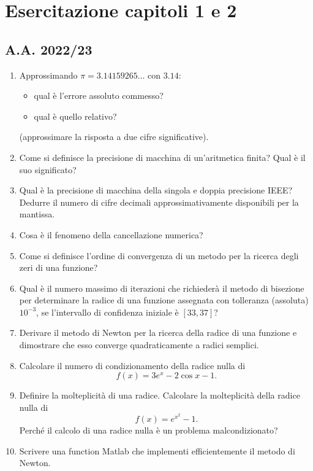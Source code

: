 \section{Esercitazione capitoli 1 e 2}
\subsection{A.A. 2022/23}
\begin{enumerate}
	\item Approssimando $\pi = 3.14159265\hdots$ con $3.14$:
	\begin{itemize}
		\item qual è l’errore assoluto commesso?
		\item  qual è quello relativo?
	\end{itemize}
	(approssimare la risposta a due cifre significative).
	\item Come si definisce la precisione di macchina di un’aritmetica finita? Qual è il suo significato?
	\item Qual è la precisione di macchina della singola e doppia precisione IEEE? Dedurre il numero di cifre decimali approssimativamente disponibili per la mantissa.
	\item Cosa è il fenomeno della cancellazione numerica?
	\item Come si definisce l’ordine di convergenza di un metodo per la ricerca degli zeri di una funzione?
	\item Qual è il numero massimo di iterazioni che richiederà il metodo di bisezione per determinare la radice di una funzione assegnata con tolleranza (assoluta) $10^{-3}$, se l’intervallo di confidenza iniziale è $[33, 37]$?
	\item Derivare il metodo di Newton per la ricerca della radice di una funzione e dimostrare che esso converge quadraticamente a radici semplici.
	\item Calcolare il numero di condizionamento della radice nulla di
	\begin{equation*}
		f(x)=3e^x-2\cos{x}-1.
	\end{equation*}
	\item Definire la molteplicità di una radice. Calcolare la molteplicità della radice nulla di
	\begin{equation*}
		f(x)=e^{x^2}-1.
	\end{equation*}
	Perché il calcolo di una radice nulla è un problema malcondizionato?
	\item Scrivere una function Matlab che implementi efficientemente il metodo di Newton.
\end{enumerate}

